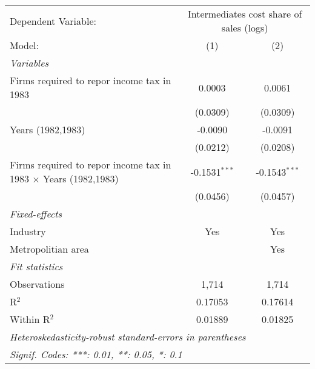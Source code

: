 
\begingroup
\centering
\begin{tabular}{lcc}
   \tabularnewline \midrule \midrule
   Dependent Variable: & \multicolumn{2}{c}{Intermediates cost share of sales (logs)}\\
   Model:                                                                 & (1)             & (2)\\  
   \midrule
   \emph{Variables}\\
   Firms required to repor income tax in 1983                             & 0.0003          & 0.0061\\   
                                                                          & (0.0309)        & (0.0309)\\   
   Years (1982,1983)                                                      & -0.0090         & -0.0091\\   
                                                                          & (0.0212)        & (0.0208)\\   
   Firms required to repor income tax in 1983 $\times$ Years (1982,1983)  & -0.1531$^{***}$ & -0.1543$^{***}$\\   
                                                                          & (0.0456)        & (0.0457)\\   
   \midrule
   \emph{Fixed-effects}\\
   Industry                                                               & Yes             & Yes\\  
   Metropolitian area                                                     &                 & Yes\\  
   \midrule
   \emph{Fit statistics}\\
   Observations                                                           & 1,714           & 1,714\\  
   R$^2$                                                                  & 0.17053         & 0.17614\\  
   Within R$^2$                                                           & 0.01889         & 0.01825\\  
   \midrule \midrule
   \multicolumn{3}{l}{\emph{Heteroskedasticity-robust standard-errors in parentheses}}\\
   \multicolumn{3}{l}{\emph{Signif. Codes: ***: 0.01, **: 0.05, *: 0.1}}\\
\end{tabular}
\par\endgroup


